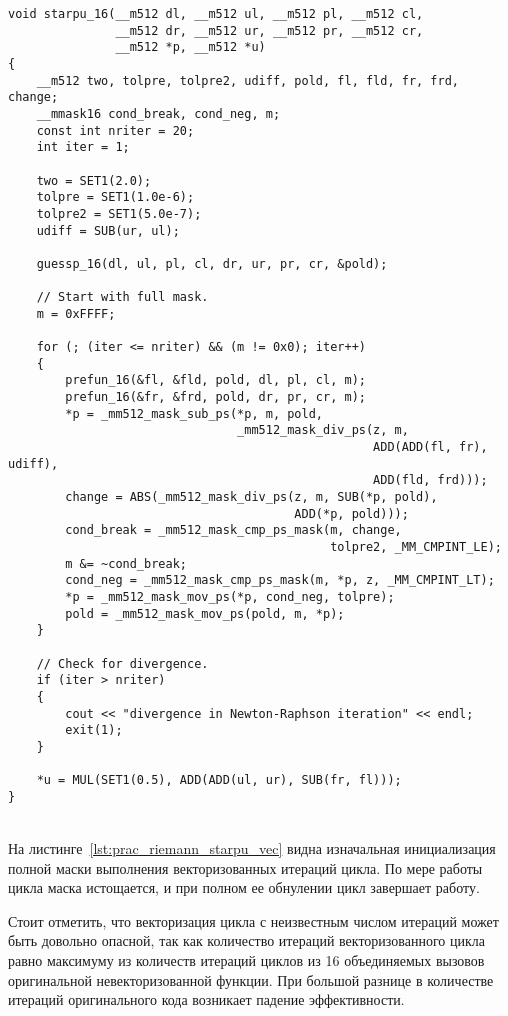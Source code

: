 \documentclass[
11pt,%
tightenlines,%
twoside,%
onecolumn,%
nofloats,%
nobibnotes,%
nofootinbib,%
superscriptaddress,%
noshowpacs,%
centertags]%
{revtex4}
\begin{document}
\begin{lstlisting}[caption={Векторизованная версия функции \texttt{starpu}.},label={lst:prac_riemann_starpu_vec}]
void starpu_16(__m512 dl, __m512 ul, __m512 pl, __m512 cl,
               __m512 dr, __m512 ur, __m512 pr, __m512 cr,
               __m512 *p, __m512 *u)
{
    __m512 two, tolpre, tolpre2, udiff, pold, fl, fld, fr, frd, change;
    __mmask16 cond_break, cond_neg, m;
    const int nriter = 20;
    int iter = 1;

    two = SET1(2.0);
    tolpre = SET1(1.0e-6);
    tolpre2 = SET1(5.0e-7);
    udiff = SUB(ur, ul);

    guessp_16(dl, ul, pl, cl, dr, ur, pr, cr, &pold);

    // Start with full mask.
    m = 0xFFFF;

    for (; (iter <= nriter) && (m != 0x0); iter++)
    {
        prefun_16(&fl, &fld, pold, dl, pl, cl, m);
        prefun_16(&fr, &frd, pold, dr, pr, cr, m);
        *p = _mm512_mask_sub_ps(*p, m, pold,
                                _mm512_mask_div_ps(z, m,
                                                   ADD(ADD(fl, fr), udiff),
                                                   ADD(fld, frd)));
        change = ABS(_mm512_mask_div_ps(z, m, SUB(*p, pold),
                                        ADD(*p, pold)));
        cond_break = _mm512_mask_cmp_ps_mask(m, change,
                                             tolpre2, _MM_CMPINT_LE);
        m &= ~cond_break;
        cond_neg = _mm512_mask_cmp_ps_mask(m, *p, z, _MM_CMPINT_LT);
        *p = _mm512_mask_mov_ps(*p, cond_neg, tolpre);
        pold = _mm512_mask_mov_ps(pold, m, *p);
    }

    // Check for divergence.
    if (iter > nriter)
    {
        cout << "divergence in Newton-Raphson iteration" << endl;
        exit(1);
    }

    *u = MUL(SET1(0.5), ADD(ADD(ul, ur), SUB(fr, fl)));
}
\end{lstlisting}

\ \\

На листинге~\ref{lst:prac_riemann_starpu_vec} видна изначальная инициализация полной маски выполнения векторизованных итераций цикла. По мере работы цикла маска истощается, и при полном ее обнулении цикл завершает работу.

Стоит отметить, что векторизация цикла с неизвестным числом итераций может быть довольно опасной, так как количество итераций векторизованного цикла равно максимуму из количеств итераций циклов из 16 объединяемых вызовов оригинальной невекторизованной функции.
При большой разнице в количестве итераций оригинального кода возникает падение эффективности.
\end{document}
